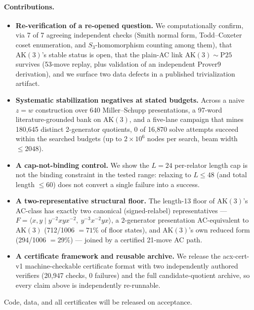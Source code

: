 \paragraph{Contributions.}
\begin{itemize}
  \item \textbf{Re-verification of a re-opened question.} We computationally confirm, via
    7 of 7 agreeing independent checks (Smith normal form, Todd--Coxeter coset enumeration,
    and $S_3$-homomorphism counting among them), that $\mathrm{AK}(3)$'s stable status is
    open, that the plain-AC link $\mathrm{AK}(3)\sim\mathrm{P}25$ survives (53-move replay,
    plus validation of an independent Prover9 derivation), and we surface two data defects
    in a published trivialization artifact.
  \item \textbf{Systematic stabilization negatives at stated budgets.} Across a naive
    $z=w$ construction over 640 Miller--Schupp presentations, a 97-word literature-grounded
    bank on $\mathrm{AK}(3)$, and a five-lane campaign that mines 180{,}645 distinct
    2-generator quotients, 0 of 16{,}870 solve attempts succeed within the searched
    budgets (up to $2\times10^{6}$ nodes per search, beam width $\le 2048$).
  \item \textbf{A cap-not-binding control.} We show the $L=24$ per-relator length cap is
    not the binding constraint in the tested range: relaxing to $L\le 48$ (and total
    length $\le 60$) does not convert a single failure into a success.
  \item \textbf{A two-representative structural floor.} The length-13 floor of
    $\mathrm{AK}(3)$'s AC-class has exactly two canonical (signed-relabel) representatives
    --- $F=\langle x,y \mid y^{-2}xyx^{-2},\ y^{-3}x^{-2}yx\rangle$, a $2$-generator
    presentation AC-equivalent to $\mathrm{AK}(3)$ (712/1006 $=71\%$ of floor states), and
    $\mathrm{AK}(3)$'s own reduced form (294/1006 $=29\%$) --- joined by a certified 21-move
    AC path.
  \item \textbf{A certificate framework and reusable archive.} We release the acx-cert-v1
    machine-checkable certificate format with two independently authored verifiers
    (20{,}947 checks, 0 failures) and the full candidate-quotient archive, so every claim
    above is independently re-runnable.
\end{itemize}

Code, data, and all certificates will be released on acceptance.
